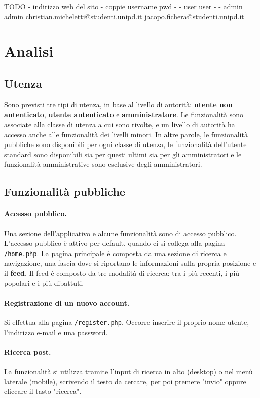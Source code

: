 \documentclass[12pt, a4paper]{article}
\begin{document}
TODO 
- indirizzo web del sito
- coppie username pwd 
- - user user
- - admin admin
christian.micheletti@studenti.unipd.it
jacopo.fichera@studenti.unipd.it

\newpage

\tableofcontents

\newpage

\section{Analisi}
\subsection{Utenza}
Sono previsti tre tipi di utenza, in base al livello di autorità: \textbf{utente non autenticato}, \textbf{utente autenticato} e \textbf{amministratore}. Le funzionalità sono associate alla classe di utenza a cui sono rivolte, e un livello di autorità ha accesso anche alle funzionalità dei livelli minori. In altre parole, le funzionalità pubbliche sono disponibili per ogni classe di utenza, le funzionalità dell'utente standard sono disponibili sia per questi ultimi sia per gli amministratori e le funzionalità amministrative sono esclusive degli amministratori.
\subsection{Funzionalità pubbliche}
\paragraph{Accesso pubblico.} Una sezione dell'applicativo e alcune funzionalità sono di accesso pubblico. L'accesso pubblico è attivo per default, quando ci si collega alla pagina \texttt{/home.php}. La pagina principale è composta da una sezione di ricerca e navigazione, una fascia dove si riportano le informazioni sulla propria posizione e il \textbf{feed}. Il feed è composto da tre modalità di ricerca: tra i più recenti, i più popolari e i più dibattuti.
\paragraph{Registrazione di un nuovo account.} Si effettua alla pagina \texttt{/register.php}. Occorre inserire il proprio nome utente, l'indirizzo e-mail e una password.
\paragraph{Ricerca post.} La funzionalità si utilizza tramite l'input di ricerca in alto (desktop) o nel menù laterale (mobile), scrivendo il testo da cercare, per poi premere "invio" oppure cliccare il tasto "ricerca".  
\end{document}
